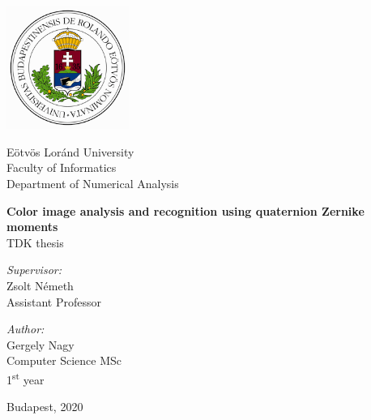 \documentclass[runningheads,a4paper,11pt]{report}
\begin{document}


\begin{titlepage}
  \noindent
  \begin{minipage}{0.25 \textwidth}
    \includegraphics[height=40mm]{figures/cimer.png}
  \end{minipage}
  \hfill
  \begin{minipage}{0.67 \textwidth}
    \large
    Eötvös Loránd University \\
    Faculty of Informatics \\
    Department of Numerical Analysis \\
    
  \end{minipage}

  \vfill

  \begin{center}
    {\LARGE \bfseries Color image analysis and recognition using quaternion Zernike moments} 
    \\[2.0cm]
    {\Large TDK thesis}
    \\[3cm]
    \begin{minipage}[t]{0.45 \textwidth}
      \emph{Supervisor:} \\[0.25 \baselineskip]
      {\large Zsolt Németh} \\[0.5 \baselineskip]
      Assistant Professor
    \end{minipage}
    \begin{minipage}[t]{0.45 \textwidth}
      \begin{flushright}
        \emph{Author:} \\[0.25 \baselineskip]
        {\large Gergely Nagy} \\[0.5 \baselineskip]
        Computer Science MSc \\ %
        1\textsuperscript{st} year
      \end{flushright}
    \end{minipage}
  \end{center}

  \vfill

  \begin{center}
    \large Budapest, 2020

  \end{center}
\end{titlepage}
\end{document}
